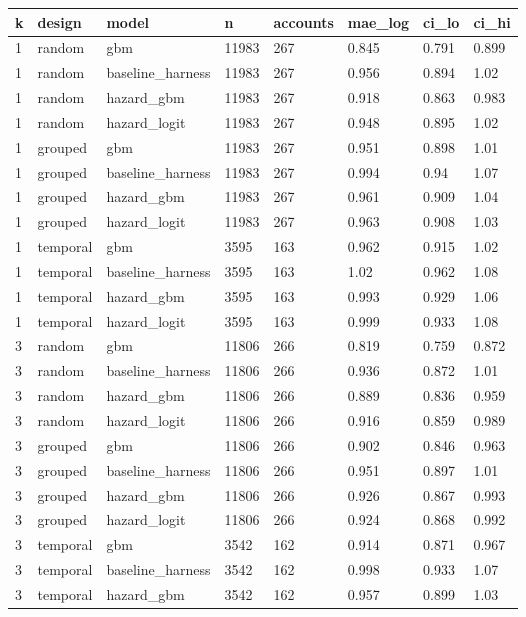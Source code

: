 \begin{tabular}{llllllll}
\toprule
k & design & model & n & accounts & mae\_log & ci\_lo & ci\_hi \\
\midrule
1 & random & gbm & 11983 & 267 & 0.845 & 0.791 & 0.899 \\
1 & random & baseline\_harness & 11983 & 267 & 0.956 & 0.894 & 1.02 \\
1 & random & hazard\_gbm & 11983 & 267 & 0.918 & 0.863 & 0.983 \\
1 & random & hazard\_logit & 11983 & 267 & 0.948 & 0.895 & 1.02 \\
1 & grouped & gbm & 11983 & 267 & 0.951 & 0.898 & 1.01 \\
1 & grouped & baseline\_harness & 11983 & 267 & 0.994 & 0.94 & 1.07 \\
1 & grouped & hazard\_gbm & 11983 & 267 & 0.961 & 0.909 & 1.04 \\
1 & grouped & hazard\_logit & 11983 & 267 & 0.963 & 0.908 & 1.03 \\
1 & temporal & gbm & 3595 & 163 & 0.962 & 0.915 & 1.02 \\
1 & temporal & baseline\_harness & 3595 & 163 & 1.02 & 0.962 & 1.08 \\
1 & temporal & hazard\_gbm & 3595 & 163 & 0.993 & 0.929 & 1.06 \\
1 & temporal & hazard\_logit & 3595 & 163 & 0.999 & 0.933 & 1.08 \\
3 & random & gbm & 11806 & 266 & 0.819 & 0.759 & 0.872 \\
3 & random & baseline\_harness & 11806 & 266 & 0.936 & 0.872 & 1.01 \\
3 & random & hazard\_gbm & 11806 & 266 & 0.889 & 0.836 & 0.959 \\
3 & random & hazard\_logit & 11806 & 266 & 0.916 & 0.859 & 0.989 \\
3 & grouped & gbm & 11806 & 266 & 0.902 & 0.846 & 0.963 \\
3 & grouped & baseline\_harness & 11806 & 266 & 0.951 & 0.897 & 1.01 \\
3 & grouped & hazard\_gbm & 11806 & 266 & 0.926 & 0.867 & 0.993 \\
3 & grouped & hazard\_logit & 11806 & 266 & 0.924 & 0.868 & 0.992 \\
3 & temporal & gbm & 3542 & 162 & 0.914 & 0.871 & 0.967 \\
3 & temporal & baseline\_harness & 3542 & 162 & 0.998 & 0.933 & 1.07 \\
3 & temporal & hazard\_gbm & 3542 & 162 & 0.957 & 0.899 & 1.03 \\

\end{tabular}

